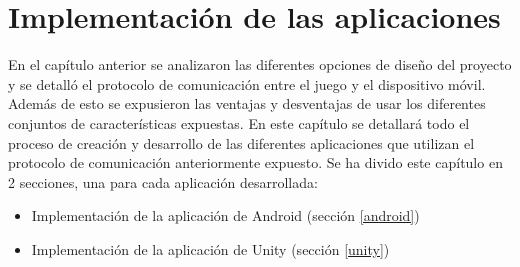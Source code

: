 %
%
%
%
%
%
%
%
%
%

\chapter{Implementaci\'on de las aplicaciones}
\label{cap4}
\label{cap:impl}

En el cap\'itulo anterior se analizaron las diferentes opciones de dise\~no del proyecto y se detall\'o el protocolo de comunicaci\'on entre el juego y el dispositivo m\'ovil. Adem\'as de esto se expusieron las ventajas y desventajas de usar los diferentes conjuntos de caracter\'isticas expuestas. En este cap\'itulo se detallar\'a todo el proceso de creaci\'on y desarrollo de las diferentes aplicaciones que utilizan el protocolo de comunicaci\'on anteriormente expuesto.
Se ha divido este cap\'itulo en 2 secciones, una para cada aplicaci\'on desarrollada:

\begin {itemize}
\item Implementaci\'on de la aplicaci\'on de Android (secci\'on \ref{android})
\item Implementaci\'on de la aplicaci\'on de Unity (secci\'on \ref{unity})
\end {itemize}

